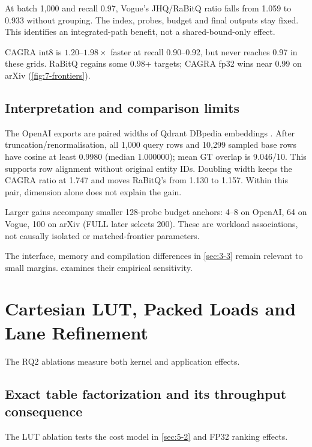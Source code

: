 At batch 1,000 and recall 0.97, Vogue's JHQ/RaBitQ ratio falls from 1.059 to 0.933 without grouping. The index, probes, budget and final outputs stay fixed. This identifies an integrated-path benefit, not a shared-bound-only effect.

CAGRA int8 is $1.20$--$1.98\times$ faster at recall 0.90--0.92, but never reaches 0.97 in these grids. RaBitQ regains some 0.98+ targets; CAGRA fp32 wins near 0.99 on arXiv (\cref{fig:7-frontiers}).



\subsection{Interpretation and comparison limits}

The OpenAI exports are paired widths of Qdrant DBpedia embeddings \cite{data_openai1536,data_openai3072}. After truncation/renormalisation, all 1,000 query rows and 10,299 sampled base rows have cosine at least 0.9980 (median 1.000000); mean GT overlap is 9.046/10. This supports row alignment without original entity IDs. Doubling width keeps the CAGRA ratio at 1.747 and moves RaBitQ's from 1.130 to 1.157. Within this pair, dimension alone does not explain the gain.

Larger gains accompany smaller 128-probe budget anchors: 4--8 on OpenAI, 64 on Vogue, 100 on arXiv (FULL later selects 200). These are workload associations, not causally isolated or matched-frontier parameters.

The interface, memory and compilation differences in \cref{sec:3-3}
remain relevant to small margins.  examines their empirical
sensitivity.




\section{Cartesian LUT, Packed Loads and Lane Refinement}
\label{sec:7-3}

The RQ2 ablations measure both kernel and application effects.

\subsection{Exact table factorization and its throughput consequence}

The LUT ablation tests the cost model in \cref{sec:5-2} and FP32 ranking
effects.

